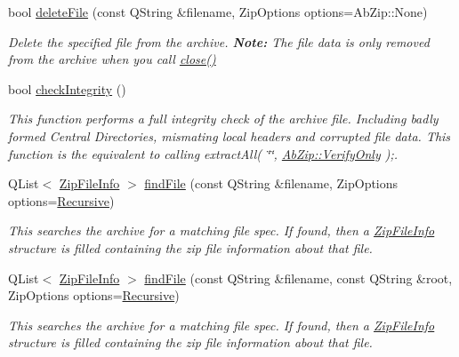 \begin{DoxyCompactItemize}
bool \hyperlink{class_ab_zip_aba2e10727c9b7267e384e4e26ba63cbc}{delete\+File} (const Q\+String \&filename, Zip\+Options options=Ab\+Zip\+::\+None)
\begin{DoxyCompactList}\small\item\em Delete the specified file from the archive. {\bfseries Note\+:} The file data is only removed from the archive when you call \hyperlink{class_ab_zip_a8a68479ea9a9b4ba18064eb4f011af83}{close()} \end{DoxyCompactList}\item 
bool \hyperlink{class_ab_zip_a783167f4c5f87551d7e2dc54b2beea3f}{check\+Integrity} ()
\begin{DoxyCompactList}\small\item\em This function performs a full integrity check of the archive file. Including badly formed Central Directories, mismating local headers and corrupted file data. This function is the equivalent to calling extract\+All( \char`\"{}\char`\"{}, \hyperlink{class_ab_zip_a9c4f57d6b8d9a449c2eb6c4d4e53c9d5aecc21ef1487642e3109d04d1a195010a}{Ab\+Zip\+::\+Verify\+Only} );. \end{DoxyCompactList}\item 
Q\+List$<$ \hyperlink{class_zip_file_info}{Zip\+File\+Info} $>$ \hyperlink{class_ab_zip_a0ac7b0fe63df09a394d7c3bdb5568c1b}{find\+File} (const Q\+String \&filename, Zip\+Options options=\hyperlink{class_ab_zip_a9c4f57d6b8d9a449c2eb6c4d4e53c9d5a23555db8b40ecaf3966a205023b515e3}{Recursive})
\begin{DoxyCompactList}\small\item\em This searches the archive for a matching file spec. If found, then a \hyperlink{class_zip_file_info}{Zip\+File\+Info} structure is filled containing the zip file information about that file. \end{DoxyCompactList}\item 
Q\+List$<$ \hyperlink{class_zip_file_info}{Zip\+File\+Info} $>$ \hyperlink{class_ab_zip_a3a60562106d519e49173bb0fdc42808f}{find\+File} (const Q\+String \&filename, const Q\+String \&root, Zip\+Options options=\hyperlink{class_ab_zip_a9c4f57d6b8d9a449c2eb6c4d4e53c9d5a23555db8b40ecaf3966a205023b515e3}{Recursive})
\begin{DoxyCompactList}\small\item\em This searches the archive for a matching file spec. If found, then a \hyperlink{class_zip_file_info}{Zip\+File\+Info} structure is filled containing the zip file information about that file. \end{DoxyCompactList}\item 

\end{DoxyCompactItemize}
